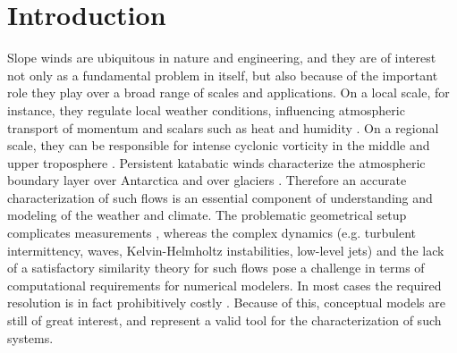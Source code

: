 \section{Introduction}
Slope winds are ubiquitous in nature and engineering, and they are of interest not only as a fundamental problem in itself, but also because of the important role they play over a broad range of scales and applications. 
On a local scale, for instance, they regulate local weather conditions, influencing atmospheric transport of momentum and scalars such as heat and humidity \citep{whiteman1990, Whiteman, Monti2002, Nylen2004b, Rotach2007, Lehner2015}. 
On a regional scale, they can be responsible for intense cyclonic vorticity in the middle and upper troposphere \citep{Parish1991, Parish1992, Parish1998}.
Persistent katabatic winds characterize the atmospheric boundary layer over Antarctica \citep{Chu1987, Renfrew2004, Renfrew2006a} and over glaciers \citep{Oerlemans1993, Oerlemans1994, pastex1994, Greuell1997, Smeets1997, Oerlemans1998, oerlemans1999, Smeets2000, Oerlemans2002}. Therefore an accurate characterization of such flows is an essential component of understanding and modeling of the weather and climate.
The problematic geometrical setup complicates measurements \citep{Oldroyd2015}, whereas the complex dynamics (e.g. turbulent intermittency, waves, Kelvin-Helmholtz instabilities, low-level jets) and the lack of a satisfactory similarity theory for such flows \citep{Nadeau2012} pose a challenge in terms of computational requirements for numerical modelers. In most cases the required resolution is in fact prohibitively costly \citep{Fedorovich2009, Fedorovich2009d, burkholder_2011}.
Because of this, conceptual models are still of great interest, and represent a valid tool for the characterization of such systems. 

